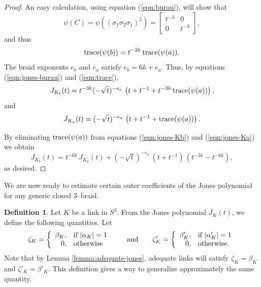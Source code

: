 \documentclass[11pt]{amsart}
\newcommand{\abs}[1]{{\left\vert #1 \right\vert}}
\theoremstyle{plain}
\theoremstyle{definition}
\newtheorem{define}[theorem]{Definition}
\begin{document}
\begin{proof} 
An easy calculation, using equation (\ref{eqn:burau}), will show that
$$\psi(C)=\psi((\sigma_1 \sigma_2 \sigma_1)^{2})=
\left[\begin{array}{cc} t^{-3}&0\\0&t^{-3}\end{array}\right],$$
%
and thus
\begin{equation}
 {\rm trace}(\psi (b))=t^{-3k}\,  {\rm trace}(\psi (a)).
\label{eqn:trace} %
\end{equation}
%
The braid exponents $e_b$ and $e_a$ satisfy
$e_b=6k + e_a$.
%
Thus, by equations (\ref{eqn:jones-burau}) and (\ref{eqn:trace}),
\begin{equation}
  J_{{K_b}}(t)= t^{-3k}(-\sqrt t)^{-e_a}\, \left(t+t^{-1}+ t^{-3k}\,
  {\rm trace}(\psi (a))\right),
\label{eqn:jones-Kb} %
\end{equation}
and
\begin{equation}
  J_{{K_a}}(t)= (-\sqrt t)^{-e_a}\, \left(t+t^{-1}+ {\rm trace}(\psi
  (a))\right). 
\label{eqn:jones-Ka} %
\end{equation}

By eliminating ${\rm trace}(\psi (a))$ from equations
(\ref{eqn:jones-Kb}) and (\ref{eqn:jones-Ka}) we obtain
\begin{equation}
 J_{{K_b}}(t)= t^{-6k}\, J_{{K_a}}(t)+ (-\sqrt t)^{-e_a}\,
\left(t+t^{-1}\right) \, \left(t^{-3k}-t^{-6k}\right),
\label{eqn:lemma-generic} %
\end{equation}
as desired.
\end{proof}
\smallskip

We are now ready to estimate certain outer coefficients of the Jones polynomial for
any generic closed 3--braid.

\begin{define}\label{def:zeta}
Let $K$ be a link in $S^3$. From the Jones polynomial $J_K(t)$, we define the following quantities. Let
$$\zeta_K = \left\{ \begin{array}{r l}
\beta_K, & \mbox{if } \abs{\alpha_K} = 1 \\
0, & \mbox{otherwise}
\end{array} \right.
\qquad \mbox{and} \qquad
\zeta'_K = \left\{ \begin{array}{r l}
\beta'_K, & \mbox{if } \abs{\alpha'_K} = 1 \\
0, & \mbox{otherwise.}
\end{array} \right.$$
 Note that by Lemma \ref{lemma:adequate-jones}, adequate links will satisfy $\zeta_K = \beta_K$ and 
$\zeta'_K = \beta'_K$. This definition gives a way to generalize approximately the same quantity.
\end{define}
\end{document}
